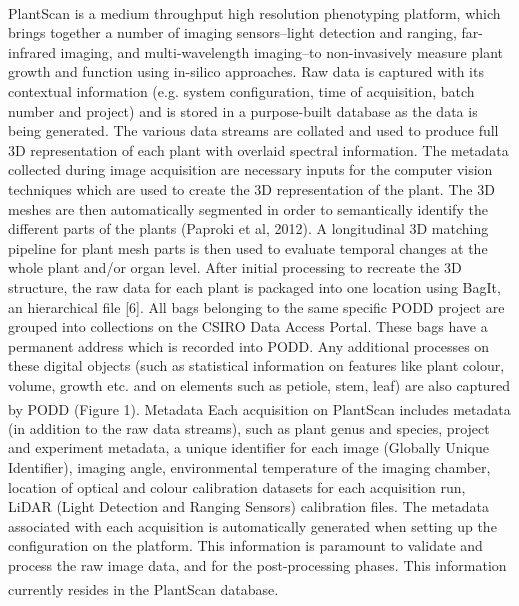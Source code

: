 \documentclass{llncs}
\begin{document}
PlantScan\textsuperscript{\texttrademark} is a medium throughput high resolution
phenotyping platform, which brings together a number of imaging sensors--light 
detection and ranging, far-infrared imaging, and multi-wavelength imaging--to non-invasively measure plant growth and function using in-silico approaches.
Raw data is captured with
its contextual information (e.g. system configuration, time of acquisition,
batch number and project) and is stored in a purpose-built database as the data
is being generated. The various data streams are collated and used to produce
full 3D representation of each plant with overlaid spectral information. The
metadata collected during image acquisition are necessary inputs for the
computer vision techniques which are used to create the 3D representation of the
plant.
The 3D meshes are then automatically segmented in order to
semantically identify the different parts of the plants (Paproki et al, 2012). A
longitudinal 3D matching pipeline for plant mesh parts is then used to evaluate 
temporal changes at the whole plant and/or organ level. After initial
processing to recreate the 3D structure, the raw data for each plant is packaged into
one location using BagIt, an hierarchical file [6]. All bags belonging to the
same specific PODD project are grouped into collections on the CSIRO Data Access
Portal. These bags have a permanent address which is recorded into PODD. Any
additional processes on these digital objects (such as statistical information
on features like plant colour, volume,  growth etc. and on elements such as
petiole, stem, leaf) are also captured by PODD (Figure 1). Metadata
Each acquisition on PlantScan\textsuperscript{\texttrademark} includes metadata
(in addition to the raw data
streams), such as plant genus and species, project and experiment metadata, a
unique identifier for each image (Globally Unique Identifier), imaging angle,
environmental temperature of the imaging chamber, location of optical and colour
calibration datasets for each acquisition run, LiDAR (Light Detection and
Ranging Sensors) calibration files. The metadata associated with each
acquisition is automatically generated when setting up the configuration on the
platform. This information is paramount to validate and process the raw image
data, and for the post-processing phases. This information currently resides in
the PlantScan\textsuperscript{\texttrademark} database.
\end{document}
